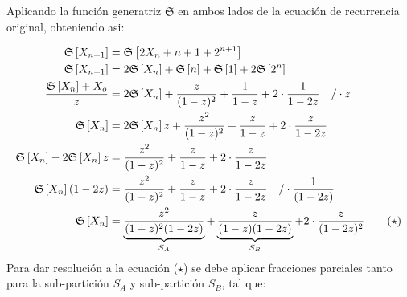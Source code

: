 Aplicando la función generatriz $\mathfrak{S}$  en ambos lados de la ecuación de recurrencia original, obteniendo asi:

\begin{align*}
    \mathfrak{S}\left[ X_{n+1} \right] &= \mathfrak{S}\left[ 2X_n + n + 1 + 2^{n+1} \right] \\
    \mathfrak{S}\left[ X_{n+1} \right] &= 2\mathfrak{S}\left[ X_n \right] + \mathfrak{S}\left[ n \right] + \mathfrak{S}\left[ 1 \right] + 2\mathfrak{S}\left[ 2^n \right] \\
    \frac{\mathfrak{S}\left[ X_n \right]+X_o}{z} &= 2\mathfrak{S}\left[ X_n \right] + \frac{z}{(1-z)^2} + \frac{1}{1-z} + 2 \cdot \frac{1}{1-2z} \quad \text{/}\cdot z\\
    \mathfrak{S}\left[ X_n \right] &= 2\mathfrak{S}\left[ X_n \right]z + \frac{z^2}{(1-z)^2} + \frac{z}{1-z} + 2\cdot \frac{z}{1-2z}\\
    \mathfrak{S}\left[ X_n \right] - 2\mathfrak{S}\left[ X_n \right]z &= \frac{z^2}{(1-z)^2} + \frac{z}{1-z} + 2\cdot \frac{z}{1-2z}\\
    \mathfrak{S}\left[ X_n \right](1 - 2z) &= \frac{z^2}{(1-z)^2} + \frac{z}{1-z} + 2\cdot \frac{z}{1-2z} \quad \text{/}\cdot \frac{1}{(1-2z)}\\
    \mathfrak{S}\left[ X_n \right] &= \underbrace{\frac{z^2}{(1-z)^2(1 - 2z)} }_{S_A} + \underbrace{\frac{z}{(1-z)(1 - 2z)}}_{S_B} + 2\cdot \frac{z}{(1-2z)^2} \tag{$\star$}
\end{align*}
Para dar resolución a la ecuación ($\star$) se debe aplicar fracciones parciales tanto para la sub-partición $S_A$ y sub-partición $S_B$, tal que:
